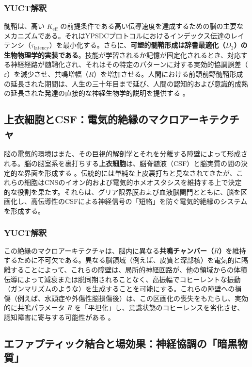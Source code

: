 \documentclass[12pt,a4paper]{article}
\begin{document}
	\subsubsection*{YUCT解釈}
	髄鞘は、高い \(K_{\mathrm{eff}}\) の前提条件である高い伝導速度を達成するための脳の主要なメカニズムである。それはYPSDCプロトコルにおけるインデックス伝達のレイテンシ（\(\tau_{\text{latency}}\)）を最小化する。さらに、\textbf{可塑的髄鞘形成は辞書最適化（\(D_2\)）の生物物理学的実装である}。技能が学習されるか記憶が固定化されるとき、対応する神経経路が髄鞘化され、それはその特定のパターンに対する実効的協調誤差（\(\varepsilon\)）を減少させ、共鳴増幅（\(R\)）を増加させる。人間における前頭前野髄鞘形成の延長された期間は、人生の三十年目まで延び、人間の認知的および意識的成熟の延長された発達の直接的な神経生物学的説明を提供する \cite{Miller2012, Fields2015}。
	
	\subsection{上衣細胞とCSF：電気的絶縁のマクロアーキテクチャ}
	
	脳の電気的環境はまた、その巨視的解剖学とそれを分離する障壁によって形成される。脳の脳室系を裏打ちする\textbf{上衣細胞}は、脳脊髄液（CSF）と脳実質の間の決定的な界面を形成する \cite{DelBigio2010}。伝統的には単純な上皮裏打ちと見なされてきたが、これらの細胞はCNSのイオン的および電気的ホメオスタシスを維持する上で決定的な役割を果たす。それらは、グリア限界膜および血液脳関門とともに、脳を区画化し、高伝導性のCSFによる神経信号の「短絡」を防ぐ電気的絶縁のシステムを形成する。
	
	\subsubsection*{YUCT解釈}
	この絶縁のマクロアーキテクチャは、脳内に異なる\textbf{共鳴チャンバー（\(R\)）}を維持するために不可欠である。異なる脳領域（例えば、皮質と深部核）を電気的に隔離することによって、これらの障壁は、局所的神経回路が、他の領域からの体積伝導によって減衰または脱同期されることなく、高振幅でコヒーレントな振動（ガンマリズムのような）を生成することを可能にする。これらの障壁への損傷（例えば、水頭症や外傷性脳損傷後）は、この区画化の喪失をもたらし、実効的に共鳴パラメータ \(R\) を「平坦化」し、意識状態のコヒーレンスを劣化させ、認知障害に寄与する可能性がある \cite{Krishnamurthy2012}。
	
	\subsection{エファプティック結合と場効果：神経協調の「暗黒物質」}
	
\end{document}
